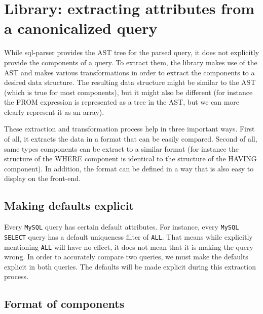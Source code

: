 \section{Library: extracting attributes from a canonicalized query}

While sql-parser provides the AST tree for the parsed query, it does not explicitly provide the components of a query. To extract them, the library makes use of the AST and makes various transformations in order to extract the components to a desired data structure. The resulting data structure might be similar to the AST (which is true for most components), but it might also be different (for instance the FROM expression is represented as a tree in the AST, but we can more clearly represent it as an array).

These extraction and transformation process help in three important ways. First of all, it extracts the data in a format that can be easily compared. Second of all, same types components can be extract to a similar format (for instance the structure of the WHERE component is identical to the structure of the HAVING component). In addition, the format can be defined in a way that is also easy to display on the front-end.

\subsection{Making defaults explicit}

Every \texttt{MySQL} query has certain default attributes. For instance, every \texttt{MySQL SELECT} query has a default uniqueness filter of \texttt{ALL}. That means while explicitly mentioning \texttt{ALL} will have no effect, it does not mean that it is making the query wrong. In order to accurately compare two queries, we must make the defaults explicit in both queries. The defaults will be made explicit during this extraction process.

\subsection{Format of components}

